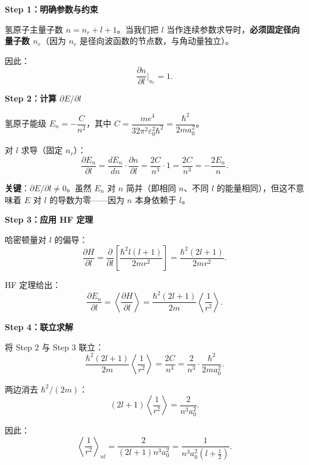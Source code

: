 \begin{derivationbox}[HF 定理对 $l$ 求导（固定 $n_r$）]
\textbf{Step 1：明确参数与约束}

氢原子主量子数 $n = n_r + l + 1$。当我们把 $l$ 当作连续参数求导时，\textbf{必须固定径向量子数 $n_r$}（因为 $n_r$ 是径向波函数的节点数，与角动量独立）。

因此：
\[
\frac{\partial n}{\partial l}\bigg|_{n_r} = 1.
\]

\textbf{Step 2：计算 $\partial E/\partial l$}

氢原子能级 $E_n = -\dfrac{C}{n^2}$，其中 $C = \dfrac{me^4}{32\pi^2\varepsilon_0^2\hbar^2} = \dfrac{\hbar^2}{2ma_0^2}$。

对 $l$ 求导（固定 $n_r$）：
\[
\frac{\partial E_n}{\partial l}
= \frac{dE_n}{dn}\cdot\frac{\partial n}{\partial l}
= \frac{2C}{n^3}\cdot 1
= \frac{2C}{n^3}
= -\frac{2E_n}{n}.
\]

\textbf{关键}：$\partial E/\partial l \neq 0$。虽然 $E_n$ 对 $n$ 简并（即相同 $n$、不同 $l$ 的能量相同），但这不意味着 $E$ 对 $l$ 的导数为零——因为 $n$ 本身依赖于 $l$。

\textbf{Step 3：应用 HF 定理}

哈密顿量对 $l$ 的偏导：
\[
\frac{\partial H}{\partial l}
= \frac{\partial}{\partial l}\left[\frac{\hbar^2 l(l+1)}{2mr^2}\right]
= \frac{\hbar^2(2l+1)}{2mr^2}.
\]

HF 定理给出：
\[
\frac{\partial E_n}{\partial l}
= \left\langle\frac{\partial H}{\partial l}\right\rangle
= \frac{\hbar^2(2l+1)}{2m}\left\langle\frac{1}{r^2}\right\rangle.
\]

\textbf{Step 4：联立求解}

将 Step 2 与 Step 3 联立：
\[
\frac{\hbar^2(2l+1)}{2m}\left\langle\frac{1}{r^2}\right\rangle
= \frac{2C}{n^3}
= \frac{2}{n^3}\cdot\frac{\hbar^2}{2ma_0^2}.
\]

两边消去 $\hbar^2/(2m)$：
\[
(2l+1)\left\langle\frac{1}{r^2}\right\rangle
= \frac{2}{n^3 a_0^2}.
\]

因此：
\[
\boxed{\left\langle \frac{1}{r^2}\right\rangle_{nl}
= \frac{2}{(2l+1)n^3 a_0^2}
= \frac{1}{n^3 a_0^2\left(l+\frac{1}{2}\right)}}.
\]
\end{derivationbox}

